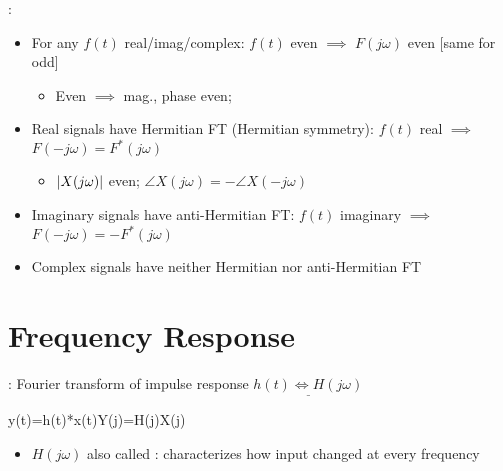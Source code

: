 \documentclass[12pt]{extarticle}
\begin{document}
\newp
{}: \begin{itemize}
    \item For any $f(t)$ real/imag/complex: $f(t)$ even $\implies$ $F(j\omega)$ even [same for odd] \begin{itemize}
        \item Even $\implies$ mag., phase even;
    \end{itemize}
    \item Real signals have Hermitian FT (Hermitian symmetry): $f(t)$ real $\implies$ $F(-j\omega)=F^\ast(j\omega)$ \begin{itemize}
        \item $\left|X(j\omega)\right|$ even; $\angle X(j\omega)=-\angle X(-j\omega)$
    \end{itemize}
    \item Imaginary signals have anti-Hermitian FT: $f(t)$ imaginary $\implies$ $F(-j\omega)=-F^\ast(j\omega)$
    \item Complex signals have neither Hermitian nor anti-Hermitian FT
\end{itemize}

\iffalse
\begin{minipage}[t]{\textwidth}
    \centering
    \texttt{[image: ft\_pairs.png]}
\end{minipage}
\fi

\pagebreak
\section{Frequency Response}
: Fourier transform of impulse response $\underline{h(t)\Longleftrightarrow H(j\omega)}$ \begin{eqnbox}
    y(t)=h(t)*x(t)\Longleftrightarrow Y(j\omega)=H(j\omega)X(j\omega)
\end{eqnbox}
\begin{itemize}
    \item $H(j\omega)$ also called : characterizes how input changed at every frequency
\end{itemize}
\end{document}
